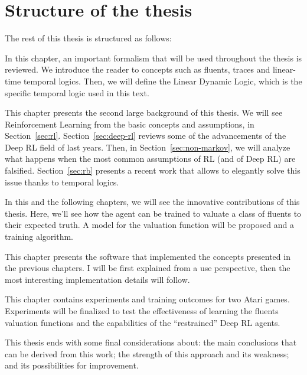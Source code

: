 \section{Structure of the thesis}

The rest of this thesis is structured as follows:
\begin{description}[style=nextline]
	\item[\ref{ch:logics}~--~\nameref{ch:logics}]
		In this chapter, an important formalism that will be used throughout the
		thesis is reviewed. We introduce the reader to concepts such as fluents,
		traces and linear-time temporal logics. Then, we will define the Linear
		Dynamic Logic, which is the specific temporal logic used in this text.
	\item[\ref{ch:rl}~--~\nameref{ch:rl}]
		This chapter presents the second large background of this thesis.  We will
		see Reinforcement Learning from the basic concepts and assumptions, in
		Section~\ref{sec:rl}. Section~\ref{sec:deep-rl} reviews some of the
		advancements of the Deep RL field of last years. Then, in
		Section~\ref{sec:non-markov}, we will analyze what happens when the most
		common assumptions of RL (and of Deep RL) are falsified.
		Section~\ref{sec:rb} presents a recent work that allows to elegantly solve
		this issue thanks to temporal logics.
	\item[\ref{ch:fluents}~--~\nameref{ch:fluents}]
		In this and the following chapters, we will see the innovative
		contributions of this thesis. Here, we'll see how the agent can be trained
		to valuate a class of fluents to their expected truth. A model for the
		valuation function will be proposed and a training algorithm.
	\item[\ref{ch:atarieyes}~--~\nameref{ch:atarieyes}]
		This chapter presents the software that implemented the concepts presented
		in the previous chapters. I will be first explained from a use
		perspective, then the most interesting implementation details will follow.
	\item[\ref{ch:experiments}~--~\nameref{ch:experiments}]
		This chapter contains experiments and training outcomes for two Atari
		games. Experiments will be finalized to test the effectiveness of learning
		the fluents valuation functions and the capabilities of the ``restrained''
		Deep RL agents.
	\item[\ref{ch:conclusions}~--~\nameref{ch:conclusions}]
		This thesis ends with some final considerations about: the main
		conclusions that can be derived from this work; the strength of this
		approach and its weakness; and its possibilities for improvement.
\end{description}

